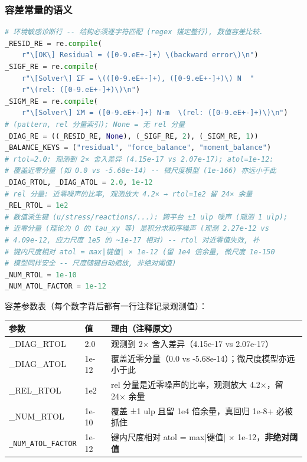 \documentclass[12pt,a4paper]{ctexart}
\begin{document}
\subsubsection{容差常量的语义}

\begin{lstlisting}[language=python]
# 环境敏感诊断行 -- 结构必须逐字符匹配 (regex 锚定整行), 数值容差比较.
_RESID_RE = re.compile(
    r"\[OK\] Residual = ([0-9.eE+-]+) \(backward error\)\n")
_SIGF_RE = re.compile(
    r"\[Solver\] ΣF = \(([0-9.eE+-]+), ([0-9.eE+-]+)\) N  "
    r"\(rel: ([0-9.eE+-]+)\)\n")
_SIGM_RE = re.compile(
    r"\[Solver\] ΣM = ([0-9.eE+-]+) N·m  \(rel: ([0-9.eE+-]+)\)\n")
# (pattern, rel 分量索引); None = 无 rel 分量
_DIAG_RE = ((_RESID_RE, None), (_SIGF_RE, 2), (_SIGM_RE, 1))
_BALANCE_KEYS = ("residual", "force_balance", "moment_balance")
# rtol=2.0: 观测到 2× 舍入差异 (4.15e-17 vs 2.07e-17); atol=1e-12:
# 覆盖近零分量 (如 0.0 vs -5.68e-14) -- 微尺度模型 (1e-166) 亦远小于此
_DIAG_RTOL, _DIAG_ATOL = 2.0, 1e-12
# rel 分量: 近零噪声的比率, 观测放大 4.2× → rtol=1e2 留 24× 余量
_REL_RTOL = 1e2
# 数值派生键 (u/stress/reactions/...): 跨平台 ±1 ulp 噪声 (观测 1 ulp);
# 近零分量 (理论为 0 的 tau_xy 等) 是积分求和序噪声 (观测 2.27e-12 vs
# 4.09e-12, 应力尺度 1e5 的 ~1e-17 相对) -- rtol 对近零值失效, 补
# 键内尺度相对 atol = max|键值| × 1e-12 (留 1e4 倍余量, 微尺度 1e-150
# 模型同样安全 -- 尺度随键自动缩放, 非绝对阈值)
_NUM_RTOL = 1e-10
_NUM_ATOL_FACTOR = 1e-12
\end{lstlisting}

容差参数表（每个数字背后都有一行注释记录观测值）：

\begin{table}[h]
\centering
\small
\begin{tabular}{p{4.2cm}p{2.6cm}p{7.2cm}}
\toprule
\textbf{参数} & \textbf{值} & \textbf{理由（注释原文）} \\
\midrule
\_DIAG\_RTOL & 2.0 & 观测到 2× 舍入差异（4.15e-17 vs 2.07e-17） \\
\_DIAG\_ATOL & 1e-12 & 覆盖近零分量（0.0 vs -5.68e-14）；微尺度模型亦远小于此 \\
\_REL\_RTOL & 1e2 & rel 分量是近零噪声的比率，观测放大 4.2×，留 24× 余量 \\
\_NUM\_RTOL & 1e-10 & 覆盖 ±1 ulp 且留 1e4 倍余量，真回归 1e-8+ 必被抓住 \\
\texttt{\_NUM\_ATOL\_\newline FACTOR} & 1e-12 & 键内尺度相对 atol = max|键值| × 1e-12，\textbf{非绝对阈值} \\
\bottomrule
\end{tabular}
\end{table}
\end{document}
